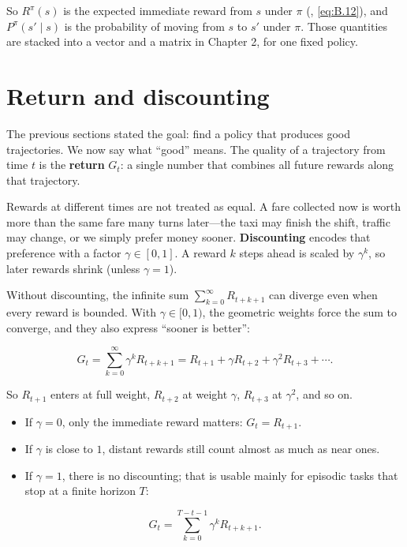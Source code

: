 So $R^\pi(s)$ is the expected immediate reward from $s$ under $\pi$ (, \eqref{eq:B.12}), and $P^\pi(s'\mid s)$ is the probability of moving from $s$ to $s'$ under $\pi$. Those quantities are stacked into a vector and a matrix in Chapter 2, for one fixed policy.

\section{Return and discounting}
The previous sections stated the goal: find a policy that produces good trajectories. We now say what ``good'' means. The quality of a trajectory from time $t$ is the \textbf{return} $G_t$: a single number that combines all future rewards along that trajectory.

Rewards at different times are not treated as equal. A fare collected now is worth more than the same fare many turns later---the taxi may finish the shift, traffic may change, or we simply prefer money sooner. \textbf{Discounting} encodes that preference with a factor $\gamma \in [0,1]$. A reward $k$ steps ahead is scaled by $\gamma^k$, so later rewards shrink (unless $\gamma=1$).

Without discounting, the infinite sum $\sum_{k=0}^\infty R_{t+k+1}$ can diverge even when every reward is bounded. With $\gamma \in [0,1)$, the geometric weights force the sum to converge, and they also express ``sooner is better'':

\begin{equation}
G_t
=
\sum_{k=0}^{\infty} \gamma^k R_{t+k+1}
=
R_{t+1} + \gamma R_{t+2} + \gamma^2 R_{t+3} + \cdots.
\tag{1.8}
\end{equation}

So $R_{t+1}$ enters at full weight, $R_{t+2}$ at weight $\gamma$, $R_{t+3}$ at $\gamma^2$, and so on.

\begin{itemize}
\item If $\gamma=0$, only the immediate reward matters: $G_t=R_{t+1}$.
\item If $\gamma$ is close to $1$, distant rewards still count almost as much as near ones.
\item If $\gamma=1$, there is no discounting; that is usable mainly for episodic tasks that stop at a finite horizon $T$:
\end{itemize}
\begin{equation}
G_t = \sum_{k=0}^{T-t-1} \gamma^k R_{t+k+1}.
\tag{1.9}
\end{equation}


